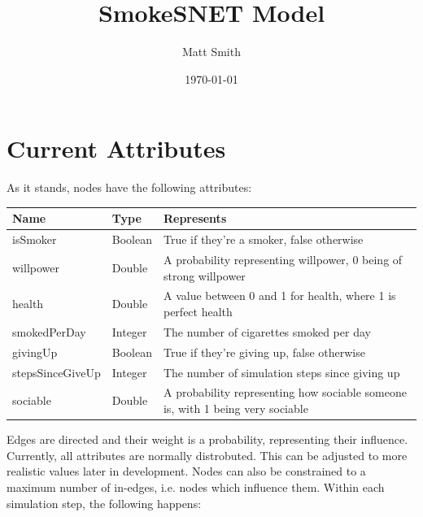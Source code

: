 \documentclass[]{article}
\begin{document}
\title{SmokeSNET Model}
\author{Matt Smith}
\date{\today}
\maketitle

\section{Current Attributes}
As it stands, nodes have the following attributes:
\begin{table}[h]
    \begin{tabular}{|l|l|l|}
        \hline
        Name & Type & Represents \\ \hline
        	isSmoker &  Boolean & True if they're a smoker, false otherwise \\ 
 	willpower &  Double & A probability representing willpower, 0 being of strong willpower \\ 
	health &  Double & A value between 0 and 1 for health, where 1 is perfect health \\ 
	smokedPerDay &  Integer & The number of cigarettes smoked per day\\ 
 	givingUp &  Boolean & True if they're giving up, false otherwise \\ 
 	stepsSinceGiveUp &  Integer & The number of simulation steps since giving up \\ 
	sociable &  Double & A probability representing how sociable someone is, with 1 being very sociable \\ 
        \hline
    \end{tabular}
\end{table}
Edges are directed and their weight is a probability, representing their influence.
Currently, all attributes are normally distrobuted. This can be adjusted to more realistic values later in development.
Nodes can also be constrained to a maximum number of in-edges, i.e. nodes which influence them. Within each simulation step, the following happens:
\end{document}
